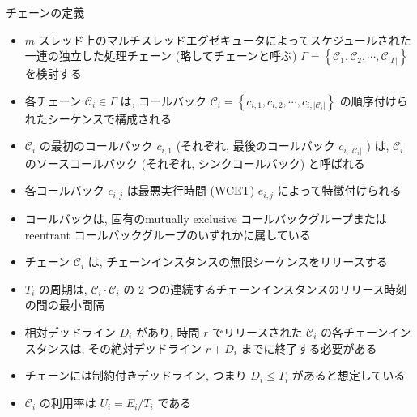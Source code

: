 \begin{frame}{チェーンの定義}

    \begin{itemize}
        \item $m$ スレッド上のマルチスレッドエグゼキュータによってスケジュールされた一連の独立した処理チェーン (略してチェーンと呼ぶ) $\Gamma=\left\{\mathcal{C}_{1}, \mathcal{C}_{2}, \cdots, \mathcal{C}_{|\Gamma|}\right\}$ を検討する


        \item 各チェーン $\mathcal{C}_{i} \in \Gamma$ は, コールバック $\mathcal{C}_{i}=\left\{c_{i, 1}, c_{i, 2}, \cdots, c_{i,\left|\mathcal{C}_{i}\right|}\right\}$ の順序付けられたシーケンスで構成される
        \item $\mathcal{C}_{i}$ の最初のコールバック $c_{i, 1}$ (それぞれ, 最後のコールバック $c_{i,\left|\mathcal{C}_{i}\right|}$ ) は, $\mathcal{C}_{i}$ のソースコールバック (それぞれ, シンクコールバック) と呼ばれる
    \end{itemize}
\end{frame}

\begin{frame}{}
    \begin{itemize}
        \item 各コールバック $c_{i, j}$ は最悪実行時間 (WCET) $e_{i, j}$ によって特徴付けられる
        \item コールバックは, 固有のmutually exclusive コールバックグループまたはreentrant コールバックグループのいずれかに属している
    \end{itemize}
\end{frame}

\begin{frame}{}
    \begin{itemize}
        \item チェーン $\mathcal{C}_{i}$ は, チェーンインスタンスの無限シーケンスをリリースする
        \item $T_{i}$ の周期は, $\mathcal{C}_{i} \cdot \mathcal{C}_{i}$ の 2 つの連続するチェーンインスタンスのリリース時刻の間の最小間隔
        \item 相対デッドライン $D_{i}$ があり, 時間 $r$ でリリースされた $\mathcal{C}_{i}$ の各チェーンインスタンスは, その絶対デッドライン $r+D_{i}$ までに終了する必要がある
        \item チェーンには制約付きデッドライン, つまり $D_{i} \leq T_{i}$ があると想定している
        \item $\mathcal{C}_{i}$ の利用率は $U_{i}=E_{i} / T_{i}$ である
    \end{itemize}
\end{frame}


